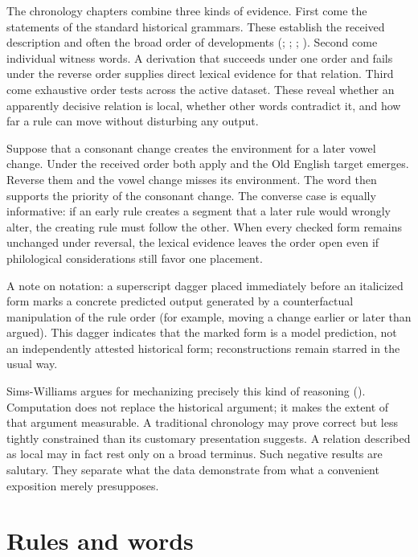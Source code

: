 \documentclass[
  british,
  a4paper,
  openany]{book}
\begin{document}
The chronology chapters combine three kinds of evidence. First come the
statements of the standard historical grammars. These establish the
received description and often the broad order of developments
(;
; ; ). Second come
individual witness words. A derivation that succeeds under one order and
fails under the reverse order supplies direct lexical evidence for that
relation. Third come exhaustive order tests across the active dataset.
These reveal whether an apparently decisive relation is local, whether
other words contradict it, and how far a rule can move without
disturbing any output.

Suppose that a consonant change creates the environment for a later
vowel change. Under the received order both apply and the Old English
target emerges. Reverse them and the vowel change misses its
environment. The word then supports the priority of the consonant
change. The converse case is equally informative: if an early rule
creates a segment that a later rule would wrongly alter, the creating
rule must follow the other. When every checked form remains unchanged
under reversal, the lexical evidence leaves the order open even if
philological considerations still favor one placement.

A note on notation: a superscript dagger placed immediately before an
italicized form marks a concrete predicted output generated by a
counterfactual manipulation of the rule order (for example, moving a
change earlier or later than argued). This dagger indicates that the
marked form is a model prediction, not an independently attested
historical form; reconstructions remain starred in the usual way.

Sims-Williams argues for mechanizing precisely this kind of reasoning
(). Computation does
not replace the historical argument; it makes the extent of that
argument measurable. A traditional chronology may prove correct but less
tightly constrained than its customary presentation suggests. A relation
described as local may in fact rest only on a broad terminus. Such
negative results are salutary. They separate what the data demonstrate
from what a convenient exposition merely presupposes.

\section{Rules and words}\label{rules-and-words}
\end{document}
